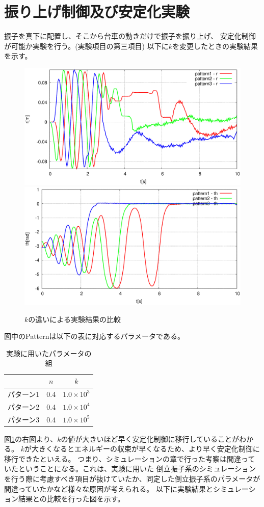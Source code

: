 \section{振り上げ制御及び安定化実験}
	振子を真下に配置し、そこから台車の動きだけで振子を振り上げ、
	安定化制御が可能か実験を行う。(実験項目の第三項目)
	以下に$k$を変更したときの実験結果を示す。
	\begin{figure}[H]
		\centering
		\includegraphics[width=0.4\linewidth]{gazo/Hexpe_R.eps}
		\includegraphics[width=0.4\linewidth]{gazo/Hexpe_TH.eps}
		\caption{$k$の違いによる実験結果の比較}
		\label{image:Hexpe}
	\end{figure}
	図中のPatternは以下の表に対応するパラメータである。
	\begin{table}[H]
		\begin{center}
			\caption{実験に用いたパラメータの組}
			\medskip
			
			\begin{tabular}{|c|c|c|}\hline
				& $n$ & $k$ \\ \hline\hline
				パターン1 & 0.4 & $1.0×10^3$  \\ \hline
				パターン2 & 0.4 & $1.0×10^4$  \\ \hline
				パターン3 & 0.4 & $1.0×10^5$  \\ \hline
			\end{tabular}
		\end{center}
		\label{table:huriage_huriage}
	\end{table}
	図\ref{image:Hexpe}の右図より、$k$の値が大きいほど早く安定化制御に移行していることがわかる。
	$k$が大きくなるとエネルギーの収束が早くなるため、より早く安定化制御に移行できたといえる。
	つまり、シミュレーションの章で行った考察は間違っていたということになる。これは、実験に用いた
	倒立振子系のシミュレーションを行う際に考慮すべき項目が抜けていたか、同定した倒立振子系のパラメータが
	間違っていたかなど様々な原因が考えられる。
	以下に実験結果とシミュレーション結果との比較を行った図を示す。
